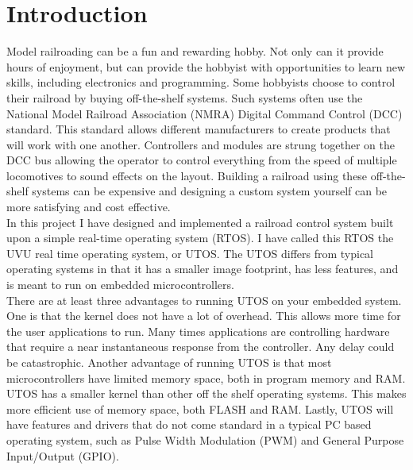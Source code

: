 \documentclass[acmlarge,screen]{acmart}
\begin{document}

\maketitle

\section{Introduction}
Model railroading can be a fun and rewarding hobby. Not only can it provide hours of enjoyment, but can provide the hobbyist with opportunities to learn new skills, including electronics and programming. Some hobbyists choose to control their railroad by buying off-the-shelf systems. Such systems often use the National Model Railroad Association (NMRA) Digital Command Control (DCC) standard\cite{DCC01}. This standard allows different manufacturers to create products that will work with one another. Controllers and modules are strung together on the DCC bus allowing the operator to control everything from the speed of multiple locomotives to sound effects on the layout. Building a railroad using these off-the-shelf systems can be expensive and designing a custom system yourself can be more satisfying and cost effective.\\

In this project I have designed and implemented a railroad control system built upon a simple real-time operating system (RTOS). I have called this RTOS the UVU real time operating system, or UTOS. The UTOS differs from typical operating systems in that it has a smaller image footprint, has less features, and is meant to run on embedded microcontrollers.\\

There are at least three advantages to running UTOS on your embedded system. One is that the kernel does not have a lot of overhead. This allows more time for the user applications to run. Many times applications are controlling hardware that require a near instantaneous response from the controller. Any delay could be catastrophic. Another advantage of running UTOS is that most microcontrollers have limited memory space, both in program memory and RAM. UTOS has a smaller kernel than other off the shelf operating systems. This makes more efficient use of memory space, both FLASH and RAM. Lastly, UTOS will have features and drivers that do not come standard in a typical PC based operating system, such as Pulse Width Modulation (PWM) and General Purpose Input/Output (GPIO).\\
\end{document}
